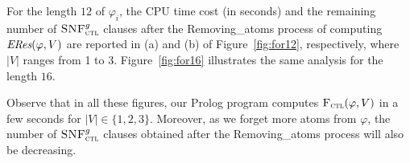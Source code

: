 \documentclass[twoside,11pt]{article}
\begin{document}
	\begin{figure*}[!htb]
		\centering
		\caption{The results of the cases for $\varphi_i=12$.}
		\label{fig:for12}
	\end{figure*}
	For the length $12$ of $\varphi_i$, the CPU time cost (in seconds) and the remaining number of ${\textsc{SNF}_{\textsc{ctl}}^g}$ clauses after the Removing\_atoms process of computing $\emph{ERes}(\varphi, V)$ are reported in (a) and (b) of Figure~\ref{fig:for12}, respectively, where $|V|$ ranges from 1 to 3. Figure~\ref{fig:for16} illustrates the same analysis for the length $16$.
	
	
	\begin{figure*}[!htb]
		\centering
		\caption{The results of the cases for $\varphi_i=16$.}
		\label{fig:for16}
	\end{figure*}
	
	Observe that in all these figures, our Prolog program computes ${\textsc{F}_{\textsc{ctl}}}(\varphi,V)$ in a few seconds for $|V|\in\{1,2,3\}$. Moreover, as we forget more atoms from $\varphi$, the number of ${\textsc{SNF}_{\textsc{ctl}}^g}$ clauses obtained after the Removing\_atoms process will also be decreasing.
	
\end{document}
